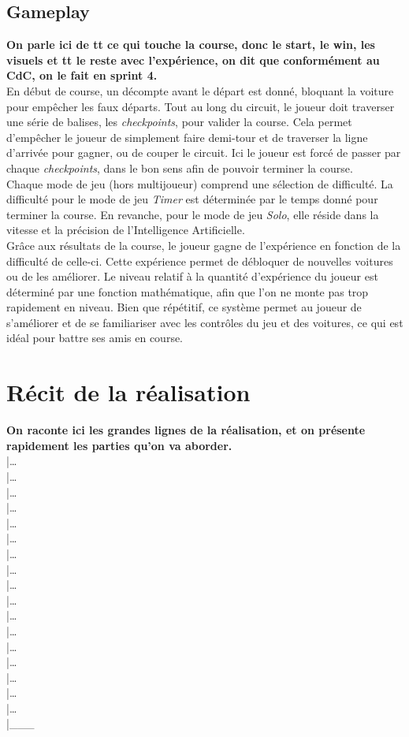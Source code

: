 \documentclass[12pt,a4paper]{article}
\newcommand{\AI}{Intelligence Artificielle}
\begin{document}
        \subsection{Gameplay}
            \textbf{On parle ici de tt ce qui touche la course, donc le start, le win, les visuels et tt
            le reste avec l'expérience, on dit que conformément au CdC, on le fait en sprint 4.}\\
            En début de course, un décompte avant le départ est donné, bloquant la voiture pour 
            empêcher les faux départs. Tout au long du circuit, le joueur doit traverser une série de balises,
            les \textsl{checkpoints}, pour valider la course. Cela permet d'empêcher le joueur
            de simplement faire demi-tour et de traverser la ligne d'arrivée pour gagner, ou
            de couper le circuit. Ici le joueur est forcé de passer par chaque \textsl{checkpoints},
            dans le bon sens afin de pouvoir terminer la course.\\
            Chaque mode de jeu (hors multijoueur) comprend une sélection de difficulté.
            La difficulté pour le mode de jeu \textsl{Timer} est déterminée par le temps
            donné pour terminer la course. En revanche, pour le mode de jeu \textsl{Solo}, 
            elle réside dans la vitesse et la précision de l'\AI. \\
            Grâce aux résultats de la course, le joueur gagne de l'expérience
            en fonction de la difficulté de celle-ci. Cette expérience permet de débloquer
            de nouvelles voitures ou de les améliorer. Le niveau relatif à la quantité d'expérience
            du joueur est déterminé par une fonction mathématique, afin que l'on ne monte pas
            trop rapidement en niveau. Bien que répétitif, ce système permet au joueur de
            s'améliorer et de se familiariser avec les contrôles du jeu et des voitures,
            ce qui est idéal pour battre ses amis en course.


    \clearpage
    \section{Récit de la réalisation}
        \textbf{On raconte ici les grandes lignes de la réalisation, et on présente rapidement les parties
        qu'on va aborder.\\}
        |\dots\\|\dots\\|\dots\\|\dots\\|\dots\\|\dots\\|\dots\\|\dots\\|\dots\\
        |\dots\\|\dots\\|\dots\\|\dots\\|\dots\\|\dots\\|\dots\\|\dots\\|\_\_\_\\
\end{document}
